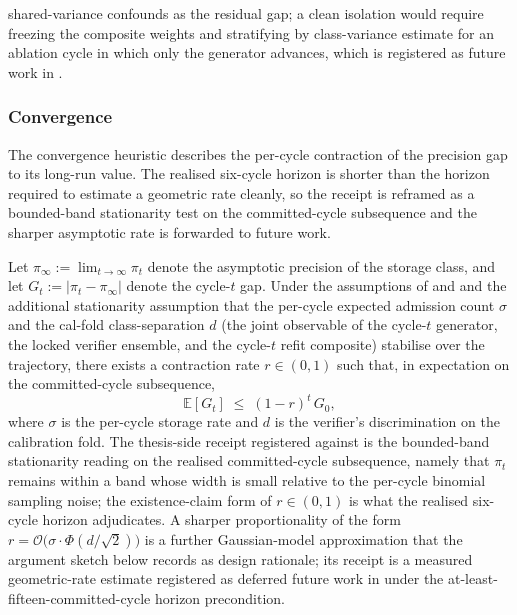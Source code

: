 shared-variance confounds as the residual gap; a clean isolation would require freezing the composite weights and stratifying by class-variance estimate for an ablation cycle in which only the generator advances, which is registered as future work in .

\subsubsection{Convergence}
\label{sec:theorem-convergence}

The convergence heuristic describes the per-cycle contraction of the precision gap to its long-run value. The realised six-cycle horizon is shorter than the horizon required to estimate a geometric rate cleanly, so the receipt is reframed as a bounded-band stationarity test on the committed-cycle subsequence and the sharper asymptotic rate is forwarded to future work.

\begin{heuristic}
\label{thm:convergence}
Let $\pi_{\infty} := \lim_{t \to \infty} \pi_{t}$ denote the asymptotic precision of the storage class, and let $G_{t} := |\pi_{t} - \pi_{\infty}|$ denote the cycle-$t$ gap. Under the assumptions of  and  and the additional stationarity assumption that the per-cycle expected admission count $\sigma$ and the cal-fold class-separation $d$ (the joint observable of the cycle-$t$ generator, the locked verifier ensemble, and the cycle-$t$ refit composite) stabilise over the trajectory, there exists a contraction rate $r \in (0,1)$ such that, in expectation on the committed-cycle subsequence,
\begin{equation}
\mathbb{E}[G_{t}] \;\le\; (1-r)^{t} \, G_{0},
\label{eq:thm-convergence}
\end{equation}
where $\sigma$ is the per-cycle storage rate and $d$ is the verifier's discrimination on the calibration fold. The thesis-side receipt registered against  is the bounded-band stationarity reading on the realised committed-cycle subsequence, namely that $\pi_t$ remains within a band whose width is small relative to the per-cycle binomial sampling noise; the existence-claim form of $r \in (0,1)$ is what the realised six-cycle horizon adjudicates. A sharper proportionality of the form $r = \mathcal{O}\!\big(\sigma \cdot \Phi(d/\sqrt{2})\big)$ is a further Gaussian-model approximation that the argument sketch below records as design rationale; its receipt is a measured geometric-rate estimate registered as deferred future work in  under the at-least-fifteen-committed-cycle horizon precondition.
\end{heuristic}

